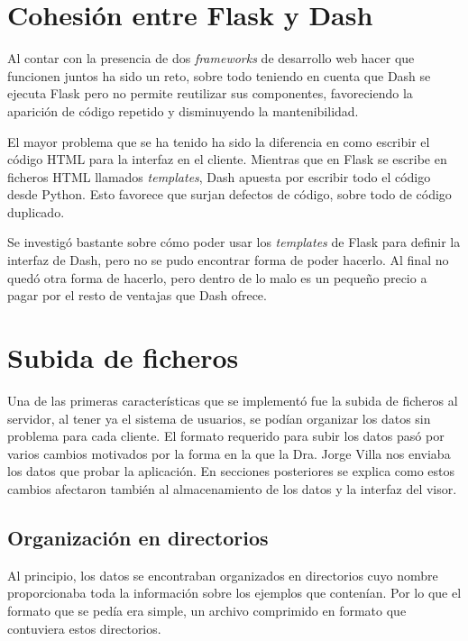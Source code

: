 \section{Cohesión entre Flask y Dash}

Al contar con la presencia de dos \textit{frameworks} de desarrollo web hacer
que funcionen juntos ha sido un reto, sobre todo teniendo en cuenta que Dash se
ejecuta Flask pero no permite reutilizar sus componentes, favoreciendo la
aparición de código repetido y disminuyendo la mantenibilidad.

El mayor problema que se ha tenido ha sido la diferencia en como escribir el
código HTML para la interfaz en el cliente. Mientras que en Flask se escribe en
ficheros HTML llamados \textit{templates}, Dash apuesta por escribir todo el
código desde Python. Esto favorece que surjan defectos de código, sobre todo de
código duplicado.

Se investigó bastante sobre cómo poder usar los \textit{templates} de Flask para
definir la interfaz de Dash, pero no se pudo encontrar forma de poder hacerlo. Al
final no quedó otra forma de hacerlo, pero dentro de lo malo es un pequeño
precio a pagar por el resto de ventajas que Dash ofrece.

\section{Subida de ficheros}\label{sec:subida}

Una de las primeras características que se implementó fue la subida de ficheros
al servidor, al tener ya el sistema de usuarios, se podían organizar los datos
sin problema para cada cliente. El formato requerido para subir los datos pasó
por varios cambios motivados por la forma en la que la Dra. Jorge Villa nos
enviaba los datos que probar la aplicación. En secciones posteriores se explica
como estos cambios afectaron también al almacenamiento de los datos y la
interfaz del visor.

\subsection{Organización en directorios}\label{sec:directorios}

Al principio, los datos se encontraban organizados en directorios cuyo nombre
proporcionaba toda la información sobre los ejemplos que contenían. Por lo que
el formato que se pedía era simple, un archivo comprimido en formato 
que contuviera estos directorios.

